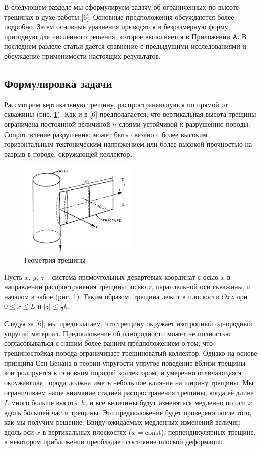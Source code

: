 \documentclass[a4paper, 12pt]{article}
\begin{document}
В следующем разделе мы сформулируем задачу об ограниченных по высоте трещинах в духе работы [6].
Основные предположения обсуждаются более подробно.
Затем основные уравнения приводятся в безразмерную форму, пригодную для численного решения, которое выполняется в Приложении А.
В последнем разделе статьи даётся сравнение с предыдущими исследованиями и обсуждение применимости настоящих результатов.

\subsection{Формулировка задачи}

Рассмотрим вертикальную трещину, распространяющуюся по прямой от скважины (рис. \ref{fig:kgd-model-geometry}).
Как и в [6] предполагается, что вертикальная высота трещины ограничена постоянной величиной $h$ слоями устойчивой к разрушению породы.
Сопротивление разрушению может быть связано с более высоким горизонтальным тектоническим напряжением или более высокой прочностью на разрыв в породе, окружающей коллектор.

\begin{figure}[H]
\center
\includegraphics[width=0.5\textwidth]{fracture_geometry}
\caption{Геометрия трещины} 
\label{fig:kgd-model-geometry}  
\end{figure}

Пусть $x$, $y$, $z$ -- система прямоугольных декартовых координат с осью $x$ в направлении распространения трещины, осью $z$, параллельной оси скважины, и началом в забое (рис. \ref{fig:kgd-model-geometry}).
Таким образом, трещина лежит в плоскости $Oxz$ при $0\leqslant x\leqslant L$ и $|z|\leqslant \frac{1}{2}h$.

Следуя за [6], мы предполагаем, что трещину окружает изотропный однородный упругий материал.
Предположение об однородности может не полностью согласовываться с нашим более ранним предположением о том, что трещиностойкая порода ограничивает трещиноватый коллектор.
Однако на основе принципа Сен-Венана в теории упругости упругое поведение вблизи трещины контролируется в основном породой коллектором, и умеренно отличающаяся окружающая порода должна иметь небольшое влияние на ширину трещины.
Мы ограничиваем наше внимание стадией распространения трещины, когда её длина $L$ много больше высоты $h$, и все величины будут изменяться медленно по оси $x$ вдоль большей части трещины.
Это предположение будет проверено после того, как мы получим решение.
Ввиду ожидаемых медленных изменений величин вдоль оси $x$ в вертикальных плоскостях ($x=\textrm{const}$), перпендикулярных трещине, в некотором приближении преобладает состояние плоской деформации.
\end{document}
